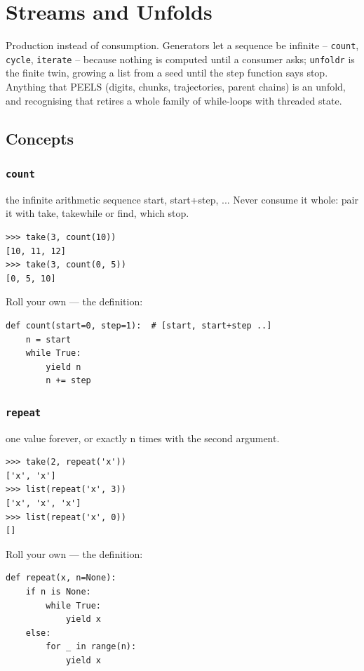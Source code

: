 \documentclass[10pt,letterpaper]{book}
\begin{document}
\chapter{Streams and Unfolds}

Production instead of consumption. Generators let a sequence be infinite --
\texttt{count}, \texttt{cycle}, \texttt{iterate} -- because nothing is
computed until a consumer asks; \texttt{unfoldr} is the finite twin, growing
a list from a seed until the step function says stop. Anything that PEELS
(digits, chunks, trajectories, parent chains) is an unfold, and recognising
that retires a whole family of while-loops with threaded state.
\section{Concepts}
\subsection{\texttt{count}}\label{def:count}
the infinite arithmetic sequence start, start+step, ... Never consume it whole: pair it with take, takewhile or find, which stop.
\begin{lstlisting}[style=ex]
>>> take(3, count(10))
[10, 11, 12]
>>> take(3, count(0, 5))
[0, 5, 10]
\end{lstlisting}

Roll your own --- the definition:

\begin{lstlisting}[style=ex]
def count(start=0, step=1):  # [start, start+step ..]
    n = start
    while True:
        yield n
        n += step
\end{lstlisting}

\subsection{\texttt{repeat}}\label{def:repeat}
one value forever, or exactly n times with the second argument.
\begin{lstlisting}[style=ex]
>>> take(2, repeat('x'))
['x', 'x']
>>> list(repeat('x', 3))
['x', 'x', 'x']
>>> list(repeat('x', 0))
[]
\end{lstlisting}

Roll your own --- the definition:

\begin{lstlisting}[style=ex]
def repeat(x, n=None):
    if n is None:
        while True:
            yield x
    else:
        for _ in range(n):
            yield x
\end{lstlisting}
\end{document}
